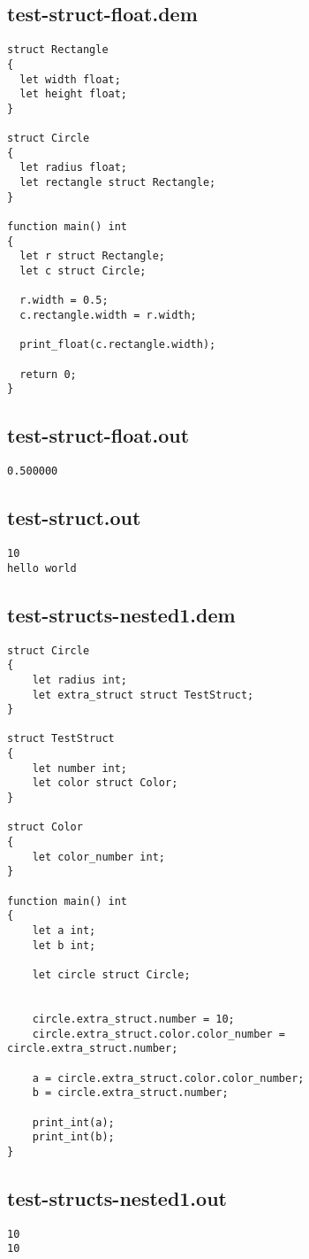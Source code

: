 \subsection{test-struct-float.dem}
\begin{lstlisting}
struct Rectangle
{
  let width float;
  let height float;
}

struct Circle
{
  let radius float;
  let rectangle struct Rectangle;
}

function main() int
{
  let r struct Rectangle;
  let c struct Circle;

  r.width = 0.5;
  c.rectangle.width = r.width;

  print_float(c.rectangle.width);

  return 0;
}
\end{lstlisting}
\subsection{test-struct-float.out}
\begin{lstlisting}
0.500000
\end{lstlisting}
\subsection{test-struct.out}
\begin{lstlisting}
10
hello world
\end{lstlisting}
\subsection{test-structs-nested1.dem}
\begin{lstlisting}
struct Circle
{
	let radius int;
	let extra_struct struct TestStruct;
}

struct TestStruct
{
	let number int;	
	let color struct Color;
}

struct Color
{
	let color_number int;
}	

function main() int
{
	let a int;
	let b int;
	
	let circle struct Circle;
	

	circle.extra_struct.number = 10;
	circle.extra_struct.color.color_number = circle.extra_struct.number;

	a = circle.extra_struct.color.color_number;
	b = circle.extra_struct.number;

	print_int(a);
	print_int(b);
}

\end{lstlisting}
\subsection{test-structs-nested1.out}
\begin{lstlisting}
10
10
\end{lstlisting}
